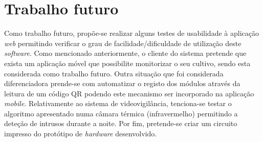 
\section{Trabalho futuro}

Como trabalho futuro, propõe-se realizar alguns testes de usabilidade à aplicação \textit{web} permitindo verificar o grau de facilidade/dificuldade de utilização deste \textit{software}.  Como mencionado anteriormente, o cliente do sistema pretende que exista um aplicação móvel que possibilite monitorizar o seu cultivo, sendo esta considerada como trabalho futuro. Outra situação que foi considerada diferenciadora prende-se com automatizar o registo dos módulos através da leitura de um código \ac{QR} podendo este mecanismo ser incorporado na aplicação \textit{mobile}. Relativamente ao sistema de videovigilância, tenciona-se testar o algoritmo apresentado numa câmara térmica (infravermelho) permitindo a deteção de intrusos durante a noite. Por fim, pretende-se criar um circuito impresso do protótipo de \textit{hardware} desenvolvido. 











 

